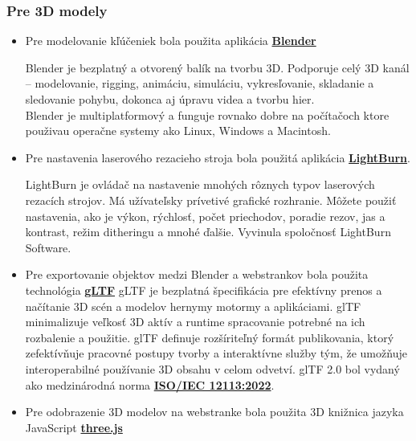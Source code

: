       \subsubsection{Pre 3D modely}
        \begin{itemize}
          \item{
            Pre modelovanie kľúčeniek bola použita aplikácia \textbf{\href{https://www.blender.org/}{Blender}} 
            
            Blender je bezplatný a otvorený balík na tvorbu 3D. Podporuje celý 3D kanál – modelovanie, rigging, animáciu, simuláciu, vykresľovanie, skladanie a sledovanie pohybu, dokonca aj úpravu videa a tvorbu hier. \\
            Blender je multiplatformový a funguje rovnako dobre na počítačoch ktore použivau operačne systemy ako Linux, Windows a Macintosh.
          }
          \item{
              Pre nastavenia laserového rezacieho stroja bola použitá aplikácia \textbf{\href{https://lightburnsoftware.com/}{LightBurn}}.

              LightBurn je ovládač na nastavenie mnohých rôznych typov laserových rezacích strojov. Má užívateľsky prívetivé grafické rozhranie. Môžete použiť nastavenia, ako je výkon, rýchlosť, počet priechodov, poradie rezov, jas a kontrast, režim ditheringu a mnohé ďalšie. Vyvinula spoločnosť LightBurn Software.
          }
          \item{
            Pre exportovanie objektov medzi Blender a webstrankov bola použita technológia \textbf{\href{https://www.khronos.org/gltf/}{gLTF}}
            gLTF je bezplatná špecifikácia pre efektívny prenos a načítanie 3D scén a modelov hernymy motormy a aplikáciami. glTF minimalizuje veľkosť 3D aktív a runtime spracovanie potrebné na ich rozbalenie a použitie. glTF definuje rozšíriteľný formát publikovania, ktorý zefektívňuje pracovné postupy tvorby a interaktívne služby tým, že umožňuje interoperabilné používanie 3D obsahu v celom odvetví. glTF 2.0 bol vydaný ako medzinárodná norma \textbf{\href{https://www.iso.org/standard/83990.html}{ISO/IEC 12113:2022}}.
          }
          \item{
            Pre odobrazenie 3D modelov na webstranke bola použita 3D knižnica jazyka JavaScript \textbf{\href{https://github.com/mrdoob/three.js/}{three.js}}
          }
        \end{itemize}

